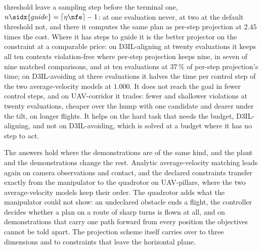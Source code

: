 \begin{description}
    threshold leave a sampling step before the terminal one, $n\sidx{guide} = \lceil \eta\nfe \rceil
    - 1$: at one evaluation never, at two at the default threshold not, and there it computes the same
    plan as per-step projection at $2.45$ times the cost. Where it has steps to guide it is the better
    projector on the constraint at a comparable price: on D3IL-aligning at twenty evaluations it keeps
    all ten contexts violation-free where per-step projection keeps nine, in seven of nine matched
    comparisons, and at ten evaluations at $37\,\%$ of per-step projection's time; on D3IL-avoiding at
    three evaluations it halves the time per control step of the two average-velocity models at
    $1.000$. It does not reach the goal in fewer control steps, and on UAV-corridor it trades: fewer
    and shallower violations at twenty evaluations, cheaper over the hump with one candidate and
    dearer under the tilt, on longer flights. It helps on the hard task that needs the budget,
    D3IL-aligning, and not on D3IL-avoiding, which is solved at a budget where it has no step to act.
  \item[RQ3 --- Transfer.] The answers hold where the demonstrations are of the same kind, and the
    plant and the demonstrations change the rest. Analytic average-velocity matching leads again on
    camera observations and contact, and the declared constraints transfer exactly from the
    manipulator to the quadrotor on UAV-pillars, where the two average-velocity models keep their
    order. The quadrotor adds what the manipulator could not show: an undeclared obstacle ends a
    flight, the controller decides whether a plan on a route of sharp turns is flown at all, and on
    demonstrations that carry one path forward from every position the objectives cannot be told
    apart. The projection scheme itself carries over to three dimensions and to constraints that leave
    the horizontal plane.
\end{description}
